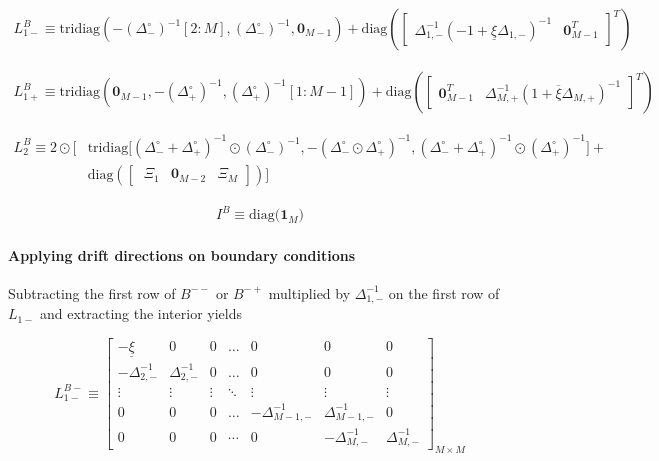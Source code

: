 \documentclass[11pt]{article}
\newcommand{\tridiag}{\ensuremath{\mathrm{tridiag}}}
\newcommand{\diag}{\ensuremath{\mathrm{diag}}}
\theoremstyle{definition}
\begin{document}
\begin{align}
{L}_{1-}^B \equiv
\tridiag \left(-(\Delta_-^\circ)^{-1}[2:M], (\Delta_-^\circ )^{-1}, \mathbf{0}_{M-1}  \right) +
\diag\left( 
\begin{bmatrix}
\Delta^{-1}_{1,-} (-1 + \underline{\xi} \Delta_{1,-})^{-1} &
\mathbf{0}_{M-1}^T
\end{bmatrix}^T
 \right)
\end{align}

\begin{align}
{L}_{1+}^B \equiv
\tridiag \left(\mathbf{0}_{M-1}, -(\Delta_+^\circ )^{-1}, (\Delta_+^\circ)^{-1}[1:M-1]  \right) +
\diag\left( 
\begin{bmatrix}
\mathbf{0}_{M-1}^T &
\Delta^{-1}_{M,+} (1 + \overline{\xi} \Delta_{M,+})^{-1}
\end{bmatrix}^T
\right)
\end{align}

\begin{align}
{L}_{2}^B \equiv
2 \odot \Big[ & \text{tridiag} \Big[(\Delta_-^\circ + \Delta_+^\circ)^{-1} \odot (\Delta_{-}^\circ)^{-1}, 
-(\Delta_-^\circ \odot \Delta_+^\circ)^{-1},
(\Delta_-^\circ + \Delta_+^\circ)^{-1} \odot (\Delta_{+}^\circ)^{-1} \Big] + \\ & \diag\left(  
\begin{bmatrix} \
\Xi_1 & \mathbf{0}_{M-2} & \Xi_M
\end{bmatrix}
  \right) \Big]
\end{align}

\begin{align}
I^B \equiv  \text{diag($\mathbf{1}_M$)}
\end{align}


\paragraph{Applying drift directions on boundary conditions}
Subtracting the first row of $B^{--}$ or $B^{-+}$ multiplied by $\Delta_{1,-}^{-1}$ on the first row of $L_{1-}$ and extracting the interior yields

\begin{equation}
L_{1-}^{B-} \equiv \begin{bmatrix}
-\underline{\xi} &0&0&\dots&0&0&0\\
-\Delta_{2,-}^{-1}&\Delta_{2,-}^{-1}&0&\dots&0&0&0\\
\vdots&\vdots&\vdots&\ddots&\vdots&\vdots&\vdots\\
0&0&0&\dots&-\Delta_{M-1,-}^{-1}&\Delta_{M-1,-}^{-1}&0\\
0&0&0&\cdots&0&-\Delta_{M,-}^{-1}&\Delta_{M,-}^{-1}
\end{bmatrix}_{M\times M}
\end{equation}
\end{document}
